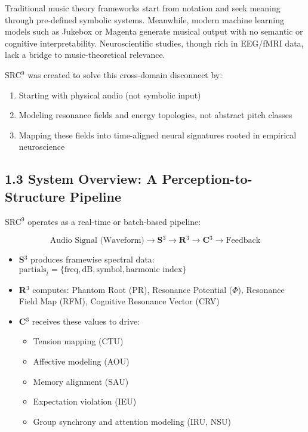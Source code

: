 \documentclass[10pt]{article}
\begin{document}
Traditional music theory frameworks start from notation and seek meaning through pre-defined symbolic systems. Meanwhile, modern machine learning models such as Jukebox or Magenta generate musical output with no semantic or cognitive interpretability. Neuroscientific studies, though rich in EEG/fMRI data, lack a bridge to music-theoretical relevance.

SRC$^{9}$ was created to solve this cross-domain disconnect by:

\begin{enumerate}
    \item Starting with physical audio (not symbolic input)
    \item Modeling resonance fields and energy topologies, not abstract pitch classes
    \item Mapping these fields into time-aligned neural signatures rooted in empirical neuroscience
\end{enumerate}

\subsection*{1.3 System Overview: A Perception-to-Structure Pipeline}

SRC$^{9}$ operates as a real-time or batch-based pipeline:

\[
\text{Audio Signal (Waveform)} 
\rightarrow \textbf{S$^{3}$} \rightarrow \textbf{R$^{3}$} \rightarrow \textbf{C$^{3}$} 
\rightarrow \text{Feedback}
\]

\begin{itemize}
    \item \textbf{S$^{3}$} produces framewise spectral data: $\text{partials}_t = \{\text{freq}, \text{dB}, \text{symbol}, \text{harmonic index}\}$
    \item \textbf{R$^{3}$} computes: Phantom Root (PR), Resonance Potential ($\Phi$), Resonance Field Map (RFM), Cognitive Resonance Vector (CRV)
    \item \textbf{C$^{3}$} receives these values to drive:
    \begin{itemize}
        \item Tension mapping (CTU)
        \item Affective modeling (AOU)
        \item Memory alignment (SAU)
        \item Expectation violation (IEU)
        \item Group synchrony and attention modeling (IRU, NSU)
    \end{itemize}
\end{itemize}
\end{document}
